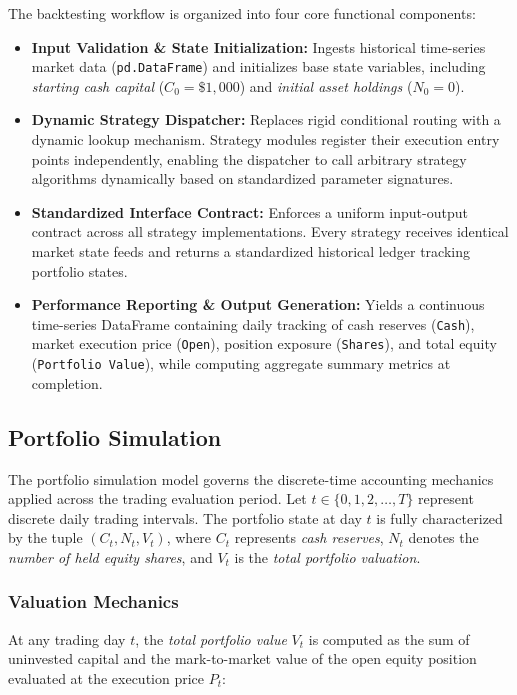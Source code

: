 \documentclass{article}
\begin{document}
The backtesting workflow is organized into four core functional components:
\begin{itemize}
    \item \textbf{Input Validation \& State Initialization:} Ingests historical time-series market data (\texttt{pd.DataFrame}) and initializes base state variables, including \textit{starting cash capital} ($C_0 = \$1{,}000$) and \textit{initial asset holdings} ($N_0 = 0$).
    \item \textbf{Dynamic Strategy Dispatcher:} Replaces rigid conditional routing with a dynamic lookup mechanism. Strategy modules register their execution entry points independently, enabling the dispatcher to call arbitrary strategy algorithms dynamically based on standardized parameter signatures.
    \item \textbf{Standardized Interface Contract:} Enforces a uniform input-output contract across all strategy implementations. Every strategy receives identical market state feeds and returns a standardized historical ledger tracking portfolio states.
    \item \textbf{Performance Reporting \& Output Generation:} Yields a continuous time-series DataFrame containing daily tracking of cash reserves (\texttt{Cash}), market execution price (\texttt{Open}), position exposure (\texttt{Shares}), and total equity (\texttt{Portfolio Value}), while computing aggregate summary metrics at completion.
\end{itemize}

\subsection{Portfolio Simulation}
The portfolio simulation model governs the discrete-time accounting mechanics applied across the trading evaluation period. Let $t \in \{0, 1, 2, \dots, T\}$ represent discrete daily trading intervals. The portfolio state at day $t$ is fully characterized by the tuple $(C_t, N_t, V_t)$, where $C_t$ represents \textit{cash reserves}, $N_t$ denotes the \textit{number of held equity shares}, and $V_t$ is the \textit{total portfolio valuation}.

\subsubsection{Valuation Mechanics}
At any trading day $t$, the \textit{total portfolio value} $V_t$ is computed as the sum of uninvested capital and the mark-to-market value of the open equity position evaluated at the execution price $P_t$:
\end{document}
